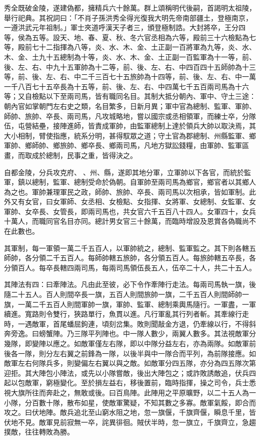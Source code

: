 \begin{pinyinscope}
秀全既破金陵，遂建偽都，擁精兵六十餘萬。群上頌稱明代後嗣，首謁明太祖陵，舉行祀典。其祝詞曰：「不肖子孫洪秀全得光復我大明先帝南部疆土，登極南京，一遵洪武元年祖制。」軍士夾道呼漢天子者三，頒登極制誥。大封將卒，王分四等，侯為五等。設天、地、春、夏、秋、冬六官丞相為六等，殿前三十六檢點為七等，殿前七十二指揮為八等，炎、水、木、金、土正副一百將軍為九等，炎、水、木、金、土九十五總制為十等，炎、水、木、金、土正副一百監軍為十一等，前、後、左、右、中九十五軍帥為十二等，前、後、左、右、中四百四十五師帥為十三等，前、後、左、右、中二千三百七十五旅帥為十四等，前、後、左、右、中一萬一千八百七十五卒長為十五等，前、後、左、右、中四萬七千五百兩司馬為十六等；又自檢點以下至兩司馬，皆有職同名目。其制大抵分朝內、軍中、守土三途：朝內官如掌朝門左右史之類，名目繁多，日新月異；軍中官為總制、監軍、軍帥、師帥、旅帥、卒長、兩司馬，凡攻城略地，嘗以國宗或丞相領軍，而練士卒，分隊伍，屯營結壘，接陣進師，皆責成軍帥，由監軍總制上達於領兵大帥以取決焉，其大小相制，臂使指應，統系分明，甚得馭眾之道；守土官為郡總制、州縣監軍、鄉軍帥、鄉師帥、鄉旅帥、鄉卒長、鄉兩司馬，凡地方獄訟錢糧，由軍帥、監軍區畫，而取成於總制，民事之重，皆得決之。

自都金陵，分兵攻克府、、州、縣，遂即其地分軍，立軍帥以下各官，而統於監軍，鎮以總制，監軍、總制受命於偽朝。自軍帥至兩司馬為鄉官，鄉官者以其鄉人為之也。軍帥兼理軍民之政，師帥、旅帥、卒長、兩司馬以次相承，皆如軍制。此外又有女官，曰女軍師、女丞相、女檢點、女指揮、女將軍、女總制、女監軍、女軍帥、女卒長、女管長，即兩司馬也，共女官六千五百八十四人。女軍四十，女兵十萬人，而職同官名目亦同。總計男女官三十餘萬，而臨時增設及恩賞各偽職尚不在此數也。

其軍制，每一軍領一萬二千五百人，以軍帥統之，總制、監軍監之。其下則各轄五師帥，各分領二千五百人。每師帥轄五旅帥，各分領五百人。每旅帥轄五卒長，各分領百人。每卒長轄四兩司馬，每兩司馬領伍長五人，伍卒二十人，共二十五人。

其陣法有四：曰牽陣法。凡由此至彼，必下令作牽陣行走法。每兩司馬執一旗，後隨二十五人。百人則間卒長一旗，五百人則間旅帥一旗，二千五百人則間師帥一旗，一萬二千五百人則間軍帥一旗，軍帥、監軍、總制乘輿馬隨行。一軍盡，一軍續進。寬路則令雙行，狹路單行，魚貫以進。凡行軍亂其行列者斬。其牽線行走時，一遇敵軍，首尾蟠屈鉤連，頃刻岔集。敗則聞敲金方退，仍牽線以行，不得斜奔旁逸。曰螃蟹陣。乃三隊平列陣也。中一隊人數少，兩翼人數多。其法視敵軍分幾隊，即變陣以應之。如敵軍僅左右隊，即以中隊分益左右，亦為兩隊。如敵軍前後各一隊，則分左右翼之前鋒為一隊，以後半與中一隊合而平列，為前隊接應。如敵軍左右何隊兵多，則變偏左右翼以與之敵。如敵軍分四五隊，亦分為四五隊次第迎拒。其大陣包小陣法，或先以小隊嘗敵，後出大陣包之；或詐敗誘敵追，伏兵四起以包敵軍，窮極變化。至於損左益右，移後置前，臨時指揮，操之司令，兵士悉視大旗所往而奔赴之，無敢或後。曰百鳥陣。此陣用之平原曠野，以二十五人為一小隊，分百數十隊，散布如星，使敵軍驚疑，不知其數之多寡。敵軍氣餒，即合而攻之。曰伏地陣。敵兵追北至山窮水阻之地，忽一旗偃，千旗齊偃，瞬息千里，皆伏地不見。敵軍見前寂無一卒，詫異徘徊。賊伏半時，忽一旗立，千旗齊立，急趨撲敵，往往轉敗為勝。


\end{pinyinscope}
